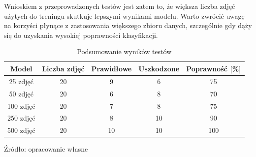 Wnioskiem z przeprowadzonych testów jest zatem to, że większa liczba zdjęć użytych do treningu skutkuje lepszymi wynikami modelu. Warto zwrócić uwagę na korzyści płynące z zastosowania większego zbioru danych, szczególnie gdy dąży się do uzyskania wysokiej poprawności klasyfikacji.

\begin{table}[H]
\centering
\caption{Podsumowanie wyników testów}
\begin{tabular}{|c|c|c|c|c|}
\hline
\textbf{Model} & \textbf{Liczba zdjęć} & \textbf{Prawidłowe} & \textbf{Uszkodzone} & \textbf{Poprawność [\%]} \\ \hline
25 zdjęć & 20 & 9 & 6 & 75 \\ \hline
50 zdjęć & 20 & 6 & 8 & 70 \\ \hline
100 zdjęć & 20 & 7 & 8 & 75 \\ \hline
250 zdjęć & 20 & 8 & 10 & 90 \\ \hline
500 zdjęć & 20 & 10 & 10 & 100 \\ \hline
\end{tabular}
\begin{center}
\footnotesize{Źródło: opracowanie własne}
\end{center}
\label{tab:test_results_summary}
\end{table}